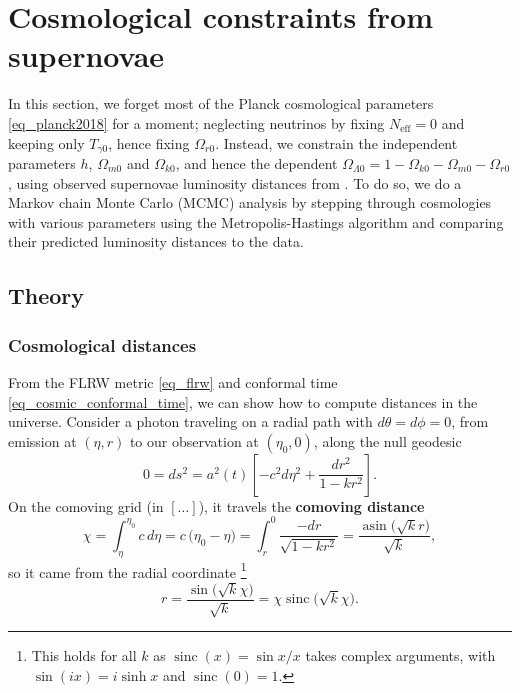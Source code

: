 \documentclass[10pt,a4paper]{article}
\DeclareMathOperator{\asin}{asin}
\DeclareMathOperator{\sinc}{sinc}
\begin{document}
\clearpage
\appendix
\section{Cosmological constraints from supernovae}
\label{sec_supernova}

In this section, we forget most of the Planck cosmological parameters \eqref{eq_planck2018} for a moment;
neglecting neutrinos by fixing $N_\text{eff}=0$ and keeping only $T_{\gamma0}$, hence fixing $\Omega_{r0}$.
Instead, we constrain the independent parameters $h$, $\Omega_{m0}$ and $\Omega_{k0}$,
and hence the dependent $\Omega_{\Lambda 0}=1-\Omega_{k0}-\Omega_{m0}-\Omega_{r0}$,
using observed supernovae luminosity distances from \cite{betouleImprovedCosmologicalConstraints2014}.
To do so, we do a Markov chain Monte Carlo (MCMC) analysis
by stepping through cosmologies with various parameters using the Metropolis-Hastings algorithm
and comparing their predicted luminosity distances to the data.

\subsection{Theory}

\subsubsection*{Cosmological distances}

From the FLRW metric \eqref{eq_flrw} and conformal time \eqref{eq_cosmic_conformal_time},
we can show how to compute distances in the universe.
Consider a photon traveling on a radial path with $d\theta = d\phi = 0$,
from emission at $(\eta,r)$ to our observation at $(\eta_0, 0)$,
along the null geodesic
\begin{equation*}
	0 = ds^2 = a^2(t) \left[ -c^2 d\eta^2 + \frac{dr^2}{1-kr^2} \right].
\end{equation*}
On the comoving grid (in $[\ldots]$), it travels the \textbf{comoving distance}
\begin{equation}
	\chi = \int_{\eta}^{\eta_0} c \, d\eta = c \, \big(\eta_0 - \eta\big) = \int_r^0 \frac{-dr}{\sqrt{1-kr^2}} = \frac{\asin\big(\sqrt{k}r\big)}{\sqrt{k}},
\label{eq_comoving_distance}
\end{equation}
so it came from the radial coordinate%
\footnote{This holds for all $k$ as $\sinc(x) = \sin x / x$ takes complex arguments, with $\sin(ix) = i \sinh x$ and $\sinc(0) = 1$.}
\begin{equation}
	r = \frac{\sin\Big(\sqrt{k}\chi\Big)}{\sqrt{k}} = \chi \sinc\Big(\sqrt{k}\chi\Big).
\label{eq_radial_coordinate}
\end{equation}
\end{document}
